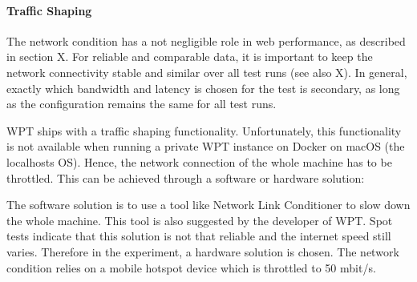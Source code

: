 



\paragraph{Traffic Shaping}


The network condition has a not negligible role in web performance, as described in section X.
For reliable and comparable data, it is important to keep the network connectivity stable and similar over all test runs (see also X).
In general, exactly which bandwidth and latency is chosen for the test is secondary, as long as the configuration remains the same for all test runs.


WPT ships with a traffic shaping functionality.
Unfortunately, this functionality is not available when running a private WPT instance on Docker on macOS (the localhosts OS).
Hence, the network connection of the whole machine has to be throttled.
This can be achieved through a software or hardware solution:

The software solution is to use a tool like Network Link Conditioner to slow down the whole machine.
This tool is also suggested by the developer of WPT. %
Spot tests indicate that this solution is not that reliable and the internet speed still varies.
Therefore in the experiment, a hardware solution is chosen.
The network condition relies on a mobile hotspot device which is throttled to 50 mbit/s.




